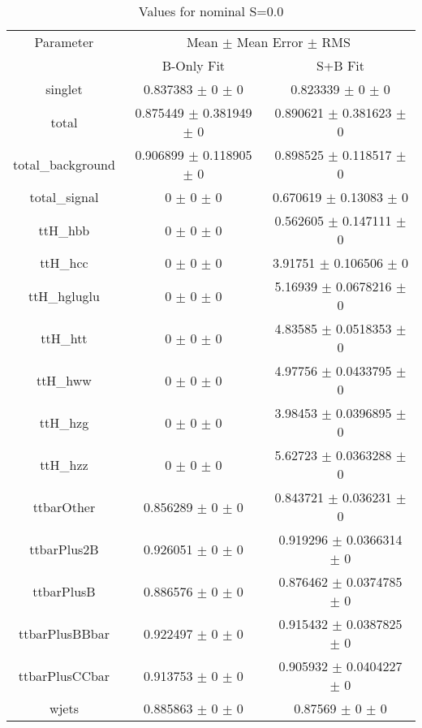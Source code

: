 \begin{table}
\centering
\caption{Values for nominal S=0.0}
\begin{tabular}{ccc}
\toprule
Parameter & \multicolumn{2}{c}{Mean $\pm$ Mean Error $\pm$ RMS}\\
 & B-Only Fit & S+B Fit\\
\midrule
singlet & \num{0.837383} $\pm$ \num{0} $\pm$ \num{0} & \num{0.823339} $\pm$ \num{0} $\pm$ \num{0}\\
total & \num{0.875449} $\pm$ \num{0.381949} $\pm$ \num{0} & \num{0.890621} $\pm$ \num{0.381623} $\pm$ \num{0}\\
total\_background & \num{0.906899} $\pm$ \num{0.118905} $\pm$ \num{0} & \num{0.898525} $\pm$ \num{0.118517} $\pm$ \num{0}\\
total\_signal & \num{0} $\pm$ \num{0} $\pm$ \num{0} & \num{0.670619} $\pm$ \num{0.13083} $\pm$ \num{0}\\
ttH\_hbb & \num{0} $\pm$ \num{0} $\pm$ \num{0} & \num{0.562605} $\pm$ \num{0.147111} $\pm$ \num{0}\\
ttH\_hcc & \num{0} $\pm$ \num{0} $\pm$ \num{0} & \num{3.91751} $\pm$ \num{0.106506} $\pm$ \num{0}\\
ttH\_hgluglu & \num{0} $\pm$ \num{0} $\pm$ \num{0} & \num{5.16939} $\pm$ \num{0.0678216} $\pm$ \num{0}\\
ttH\_htt & \num{0} $\pm$ \num{0} $\pm$ \num{0} & \num{4.83585} $\pm$ \num{0.0518353} $\pm$ \num{0}\\
ttH\_hww & \num{0} $\pm$ \num{0} $\pm$ \num{0} & \num{4.97756} $\pm$ \num{0.0433795} $\pm$ \num{0}\\
ttH\_hzg & \num{0} $\pm$ \num{0} $\pm$ \num{0} & \num{3.98453} $\pm$ \num{0.0396895} $\pm$ \num{0}\\
ttH\_hzz & \num{0} $\pm$ \num{0} $\pm$ \num{0} & \num{5.62723} $\pm$ \num{0.0363288} $\pm$ \num{0}\\
ttbarOther & \num{0.856289} $\pm$ \num{0} $\pm$ \num{0} & \num{0.843721} $\pm$ \num{0.036231} $\pm$ \num{0}\\
ttbarPlus2B & \num{0.926051} $\pm$ \num{0} $\pm$ \num{0} & \num{0.919296} $\pm$ \num{0.0366314} $\pm$ \num{0}\\
ttbarPlusB & \num{0.886576} $\pm$ \num{0} $\pm$ \num{0} & \num{0.876462} $\pm$ \num{0.0374785} $\pm$ \num{0}\\
ttbarPlusBBbar & \num{0.922497} $\pm$ \num{0} $\pm$ \num{0} & \num{0.915432} $\pm$ \num{0.0387825} $\pm$ \num{0}\\
ttbarPlusCCbar & \num{0.913753} $\pm$ \num{0} $\pm$ \num{0} & \num{0.905932} $\pm$ \num{0.0404227} $\pm$ \num{0}\\
wjets & \num{0.885863} $\pm$ \num{0} $\pm$ \num{0} & \num{0.87569} $\pm$ \num{0} $\pm$ \num{0}\\
\bottomrule
\end{tabular}
\end{table}
